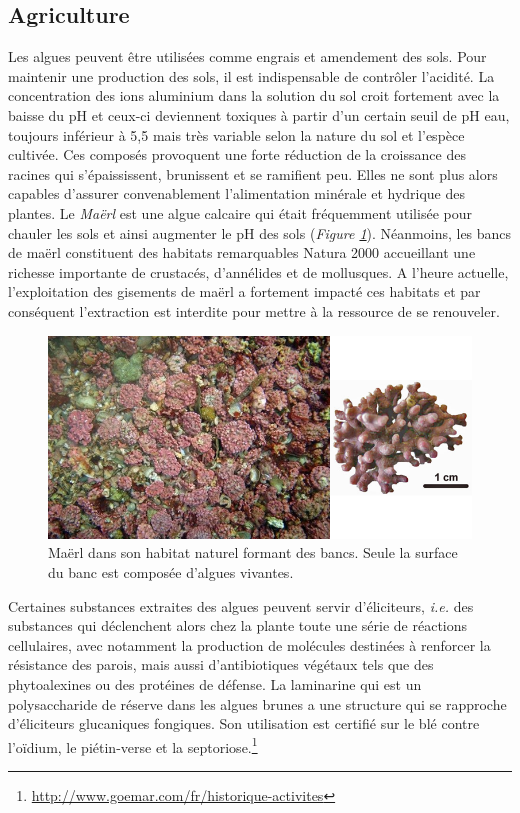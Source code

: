 \documentclass[
]{book}
\begin{document}
\hypertarget{agriculture}{%
\subsection{Agriculture}\label{agriculture}}

Les algues peuvent être utilisées comme engrais et amendement des sols. Pour maintenir une production des sols, il est indispensable de contrôler l'acidité. La concentration des ions aluminium dans la solution du sol croit fortement avec la
baisse du pH et ceux-ci deviennent toxiques à partir d'un certain seuil de pH eau, toujours inférieur à 5,5 mais très variable selon la nature du sol et l'espèce cultivée. Ces composés provoquent une forte réduction de la croissance des racines qui s'épaississent, brunissent et se ramifient peu. Elles ne sont plus alors capables d'assurer convenablement l'alimentation minérale et hydrique des plantes. Le \emph{Maërl} est une algue calcaire qui était fréquemment utilisée pour chauler les sols et ainsi augmenter le pH des sols (\emph{Figure \ref{fig:maerl}}). Néanmoins, les bancs de maërl constituent des habitats remarquables Natura 2000 accueillant une richesse importante de crustacés, d'annélides et de mollusques. A l'heure actuelle, l'exploitation des gisements de maërl a fortement impacté ces habitats et par conséquent l'extraction est interdite pour mettre à la ressource de se renouveler.

\begin{figure}

{\centering \includegraphics{images/maerl} 

}

\caption{Maërl dans son habitat naturel formant des bancs. Seule la surface du banc est composée d'algues vivantes.}\label{fig:maerl}
\end{figure}

Certaines substances extraites des algues peuvent servir d'éliciteurs, \emph{i.e.} des substances qui déclenchent alors chez la plante toute une série de réactions cellulaires, avec notamment la production de molécules destinées à renforcer la résistance des parois, mais aussi d'antibiotiques végétaux tels que des phytoalexines ou des protéines de défense.
La laminarine qui est un polysaccharide de réserve dans les algues brunes a une structure qui se rapproche d'éliciteurs glucaniques fongiques. Son utilisation est certifié sur le blé contre l'oïdium, le piétin-verse et la septoriose.\footnote{\url{http://www.goemar.com/fr/historique-activites}}
\end{document}
